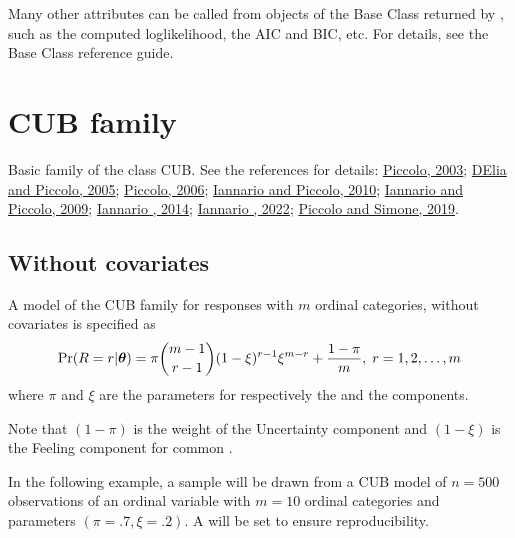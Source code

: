 \documentclass[letterpaper,10pt,english]{sphinxmanual}
\begin{document}
\sphinxAtStartPar
Many other attributes can be called from objects of the Base Class  returned by
, such as the computed loglikelihood, the AIC and BIC, etc. For details,
see  the Base Class  reference guide.


\section{CUB family}
\label{\detokenize{manual:cub-family}}
\sphinxAtStartPar
Basic family of the class CUB. See the references for details:
\hyperlink{cite.references:id4}{Piccolo, 2003}; \hyperlink{cite.references:id5}{D\textquotesingle{}Elia and Piccolo, 2005}; \hyperlink{cite.references:id7}{Piccolo, 2006};
\hyperlink{cite.references:id8}{Iannario and Piccolo, 2010}; \hyperlink{cite.references:id20}{Iannario and Piccolo, 2009}; \hyperlink{cite.references:id21}{Iannario , 2014};
\hyperlink{cite.references:id22}{Iannario , 2022}; \hyperlink{cite.references:id3}{Piccolo and Simone, 2019}.


\subsection{Without covariates}
\label{\detokenize{manual:without-covariates}}\label{\detokenize{manual:cub-without-covariates}}
\sphinxAtStartPar
{}

\sphinxAtStartPar
A model of the CUB family for responses with \(m\) ordinal categories, without covariates is specified as
\begin{equation*}
\begin{split}\Pr(R=r|\boldsymbol{\theta}) = \pi \dbinom{m-1}{r-1}(1-\xi)^{r-1}\xi^{m-r}+\dfrac{1-\pi}{m},
\; r = 1,2,\ldots,m\end{split}
\end{equation*}
\sphinxAtStartPar
where \(\pi\) and \(\xi\) are the parameters for respectively the  and the
 components.

\sphinxAtStartPar
Note that \((1-\pi)\) is the weight of the Uncertainty component and
\((1-\xi)\) is the Feeling component for common .

\sphinxAtStartPar
In the following example, a sample will be drawn from a CUB model of \(n=500\) observations of an ordinal
variable with \(m=10\) ordinal categories
and parameters \((\pi=.7, \xi=.2)\). A  will be set to ensure reproducibility.
\end{document}

